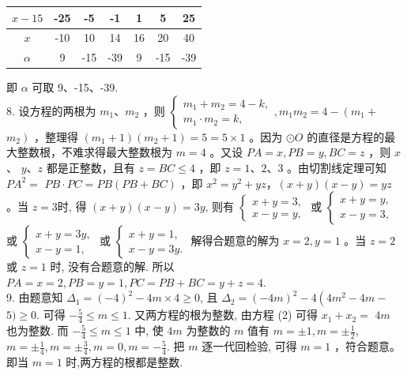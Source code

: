 \documentclass[10pt]{article}
\begin{document}
\begin{center}
\begin{tabular}{c|c|c|c|c|c|c}
\hline
$x-15$ & -25 & -5 & -1 & 1 & 5 & 25 \\
\hline
$x$ & -10 & 10 & 14 & 16 & 20 & 40 \\
\hline
$\alpha$ & 9 & -15 & -39 & 9 & -15 & -39 \\
\hline
\end{tabular}
\end{center}

即 $\alpha$ 可取 9、-15、-39.\\
8. 设方程的两根为 $m_{1} 、 m_{2}$ ，则 $\left\{\begin{array}{l}m_{1}+m_{2}=4-k, \\ m_{1} \cdot m_{2}=k,\end{array}, m_{1} m_{2}=4-\left(m_{1}+\right.\right.$ $\left.m_{2}\right)$ ，整理得 $\left(m_{1}+1\right)\left(m_{2}+1\right)=5=5 \times 1$ 。因为 $\odot O$ 的直径是方程的最大整数根，不难求得最大整数根为 $m=4$ 。又设 $P A=x, P B=y, B C=z$ ，则 $x$ 、 $y 、 z$ 都是正整数，且有 $z=B C \leqslant 4$ ，即 $z=1 、 2 、 3$ 。由切割线定理可知 $P A^{2}=$ $P B \cdot P C=P B(P B+B C)$ ，即 $x^{2}=y^{2}+y z ，(x+y)(x-y)=y z$ 。当 $z=3$时, 得 $(x+y)(x-y)=3 y$, 则有 $\left\{\begin{array}{l}x+y=3, \\ x-y=y,\end{array}\right.$ 或 $\left\{\begin{array}{l}x+y=y, \\ x-y=3,\end{array}\right.$ 或 $\left\{\begin{array}{l}x+y=3 y, \\ x-y=1,\end{array}\right.$ 或 $\left\{\begin{array}{l}x+y=1, \\ x-y=3 y .\end{array}\right.$ 解得合题意的解为 $x=2, y=1$ 。当 $z=2$ 或 $z=1$ 时, 没有合题意的解. 所以 $P A=x=2, P B=y=1, P C=P B+B C=y+z=4$.\\
9. 由题意知 $\Delta_{1}=(-4)^{2}-4 m \times 4 \geqslant 0$, 且 $\Delta_{2}=(-4 m)^{2}-4\left(4 m^{2}-4 m-\right.$ $5) \geqslant 0$. 可得 $-\frac{5}{4} \leqslant m \leqslant 1$. 又两方程的根为整数, 由方程 (2) 可得 $x_{1}+x_{2}=$ $4 m$ 也为整数. 而 $-\frac{5}{4} \leqslant m \leqslant 1$ 中, 使 $4 m$ 为整数的 $m$ 值有 $m= \pm 1, m= \pm \frac{1}{2}$, $m= \pm \frac{1}{4}, m= \pm \frac{3}{4}, m=0, m=-\frac{5}{4}$. 把 $m$ 逐一代回检验, 可得 $m=1$ ，符合题意。即当 $m=1$ 时,两方程的根都是整数.\\
\end{document}
